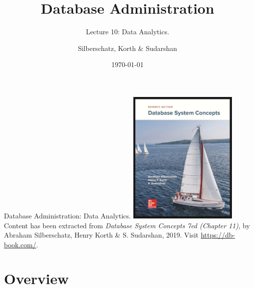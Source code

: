 \documentclass{beamer}
\title[Data Analytics]{Database Administration}
\subtitle{Lecture 10: Data Analytics.}
\author{Silberschatz, Korth \& Sudarshan}
\date{\today}
\begin{document}
\frame{\titlepage}

\begin{frame}{Database Administration: Data Analytics.}
    \centering
    \includegraphics[width=0.4\textwidth]{figures/book_cover}\\
    \vspace{2mm}
    {
        \scriptsize
        Content has been extracted from \textit{Database System Concepts 7ed (Chapter 11)}, by Abraham Silberschatz, Henry Korth \& S. Sudarshan, 2019.  Visit \url{https://db-book.com/}.
    }
\end{frame}

\section{Overview}
\end{document}
